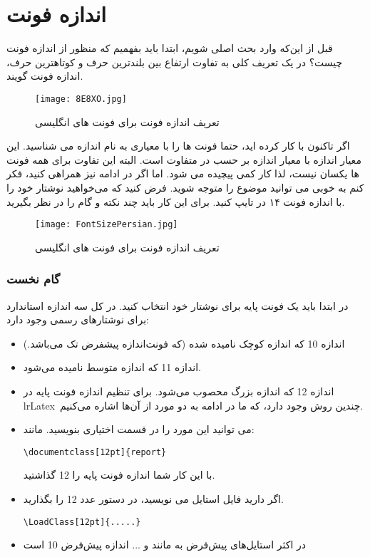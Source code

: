\section{اندازه فونت}
قبل از این‌که وارد بحث اصلی شویم، ابتدا باید بفهمیم که منظور از اندازه فونت چیست؟ در یک تعریف کلی به تفاوت ارتفاع بین بلندترین حرف و کوتاهترین حرف، اندازه فونت گویند.
\begin{figure}[h!]
 \centering\texttt{[image: 8E8XO.jpg]}
  \caption{تعریف اندازه فونت برای فونت های انگلیسی}
\end{figure}
اگر تاکنون با  کار کرده اید، حتما فونت ها را با معیاری به نام اندازه می شناسید. این معیار اندازه با معیار اندازه بر حسب  در  متفاوت است. البته این تفاوت برای همه فونت ها یکسان نیست، لذا کار کمی پیچیده می شود. اما اگر در ادامه نیز همراهی کنید، فکر کنم به خوبی می توانید موضوع را متوجه شوید. فرض کنید که می‌خواهید نوشتار خود را با اندازه فونت ۱۴ در  تایپ کنید. برای این کار باید چند نکته و گام را در نظر بگیرید.
\begin{figure}[h!]
 \centering\texttt{[image: FontSizePersian.jpg]}
 \caption{تعریف اندازه فونت برای فونت های انگلیسی}
\end{figure}
\subsubsection{گام نخست}
در ابتدا باید یک فونت پایه برای نوشتار خود انتخاب کنید. در کل سه اندازه استاندارد برای نوشتار‌های رسمی وجود دارد:
\begin{itemize}
 \item     اندازه 10 که اندازه کوچک نامیده شده (که فونت‌اندازه پیشفرض تک می‌باشد.)
  \item     اندازه 11 که اندازه متوسط نامیده می‌شود.
   \item    اندازه 12 که اندازه بزرگ محصوب می‌شود.
برای تنظیم اندازه فونت پایه در lr{Latex}\ چندین روش وجود دارد، که ما در ادامه به دو مورد از آن‌ها اشاره می‌کنیم.
     \item   می توانید این مورد را در قسمت اختیاری  بنویسید. مانند:

\begin{latin}
\begin{lstlisting}[style=Tex]
\documentclass[12pt]{report}
\end{lstlisting}
\end{latin}
با این کار شما اندازه فونت پایه را 12 گذاشتید.

     \item   اگر دارید فایل استایل می نویسید، در دستور  عدد 12 را بگذارید.
\begin{latin}
\begin{lstlisting}[style=Tex]
 \LoadClass[12pt]{.....}
\end{lstlisting}
\end{latin}
     \item   در اکثر استایل‌های پیش‌فرض  به مانند  و ... اندازه پیش‌فرض 10 است
\end{itemize}
